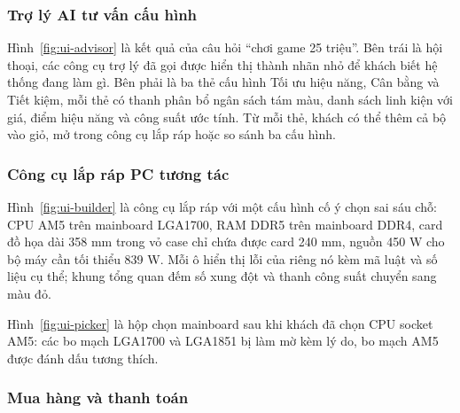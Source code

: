 
\subsubsection{Trợ lý AI tư vấn cấu hình}


Hình~\ref{fig:ui-advisor} là kết quả của câu hỏi ``chơi game 25 triệu''. Bên trái là hội thoại, các công cụ trợ lý đã gọi được hiển thị thành nhãn nhỏ để khách biết hệ thống đang làm gì. Bên phải là ba thẻ cấu hình Tối ưu hiệu năng, Cân bằng và Tiết kiệm, mỗi thẻ có thanh phân bổ ngân sách tám màu, danh sách linh kiện với giá, điểm hiệu năng và công suất ước tính. Từ mỗi thẻ, khách có thể thêm cả bộ vào giỏ, mở trong công cụ lắp ráp hoặc so sánh ba cấu hình.


\subsubsection{Công cụ lắp ráp PC tương tác}


Hình~\ref{fig:ui-builder} là công cụ lắp ráp với một cấu hình cố ý chọn sai sáu chỗ: CPU AM5 trên mainboard LGA1700, RAM DDR5 trên mainboard DDR4, card đồ họa dài 358 mm trong vỏ case chỉ chứa được card 240 mm, nguồn 450 W cho bộ máy cần tối thiểu 839 W. Mỗi ô hiển thị lỗi của riêng nó kèm mã luật và số liệu cụ thể; khung tổng quan đếm số xung đột và thanh công suất chuyển sang màu đỏ.


Hình~\ref{fig:ui-picker} là hộp chọn mainboard sau khi khách đã chọn CPU socket AM5: các bo mạch LGA1700 và LGA1851 bị làm mờ kèm lý do, bo mạch AM5 được đánh dấu tương thích.

\subsubsection{Mua hàng và thanh toán}

